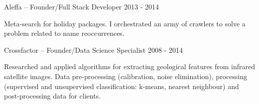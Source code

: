 \begin{cventries}
    \cventry
    {Aleffa – Founder/Full Stack Developer} %
    {} %
    {} %
    {2013 - 2014} %
    {
      \begin{cvitems} %
        \item {Meta-search for holiday packages. I orchestrated an army of crawlers to solve a problem related to name reoccurrences.}
      \end{cvitems}
    }

    \cventry
    {Crossfactor – Founder/Data Science Specialist} %
    {} %
    {} %
    {2008 - 2014} %
    {
      \begin{cvitems} %
        \item {Researched and applied algorithms for extracting geological features from infrared satellite images. Data pre-processing (calibration, noise elimination), processing (supervised and unsupervised classification: k-means, nearest neighbour) and post-processing data for clients.}
      \end{cvitems}
    }


\end{cventries}
